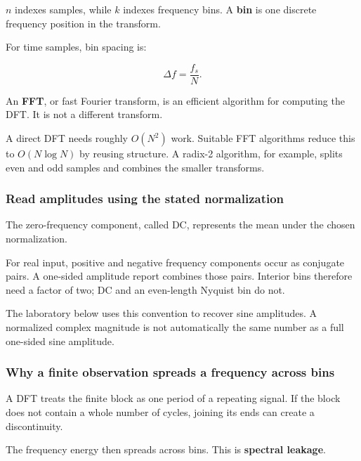 \(n\) indexes samples, while \(k\) indexes frequency bins. A \textbf{bin} is one discrete frequency position in the transform.

For time samples, bin spacing is:

\[
\Delta f=\frac{f_s}{N}.
\]

An \textbf{FFT}, or fast Fourier transform, is an efficient algorithm for computing the DFT. It is not a different transform.

A direct DFT needs roughly \(O(N^2)\) work. Suitable FFT algorithms reduce this to \(O(N\log N)\) by reusing structure. A radix-2 algorithm, for example, splits even and odd samples and combines the smaller transforms.

\subsubsection{Read amplitudes using the stated normalization}\label{04-visual-computing-ii-ch043-read-amplitudes-using-the-stated-normalization}

\hypertarget{04-visual-computing-ii-ch043-read-amplitudes-using-the-stated-normalization}{}

The zero-frequency component, called DC, represents the mean under the chosen normalization.

For real input, positive and negative frequency components occur as conjugate pairs. A one-sided amplitude report combines those pairs. Interior bins therefore need a factor of two; DC and an even-length Nyquist bin do not.

The laboratory below uses this convention to recover sine amplitudes. A normalized complex magnitude is not automatically the same number as a full one-sided sine amplitude.

\subsubsection{Why a finite observation spreads a frequency across bins}\label{04-visual-computing-ii-ch043-why-a-finite-observation-spreads-a-frequency-across-bins}

\hypertarget{04-visual-computing-ii-ch043-why-a-finite-observation-spreads-a-frequency-across-bins}{}

A DFT treats the finite block as one period of a repeating signal. If the block does not contain a whole number of cycles, joining its ends can create a discontinuity.

The frequency energy then spreads across bins. This is \textbf{spectral leakage}.

